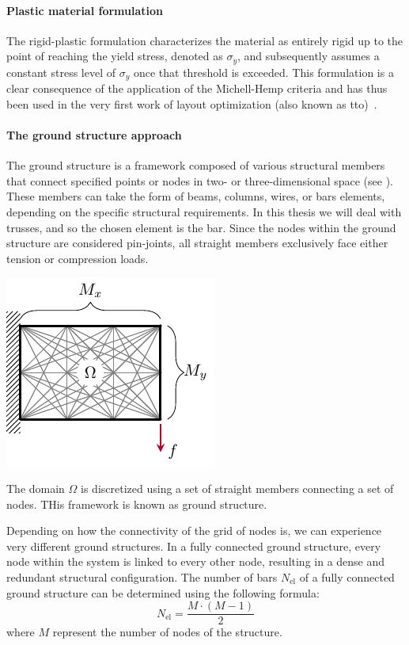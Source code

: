 \paragraph{Plastic material formulation}
The rigid-plastic formulation characterizes the material as entirely rigid up to the point of reaching the yield stress, denoted as $\sigma_y$, and subsequently assumes a constant stress level of $\sigma_y$ once that threshold is exceeded. This formulation is a clear consequence of the application of the Michell-Hemp criteria and has thus been used in the very first work of layout optimization (also known as \gls{tto})~. 

\paragraph{The ground structure approach}
The ground structure is a framework composed of various structural members that connect specified points or nodes in two- or three-dimensional space (see ). These members can take the form of beams, columns, wires, or bars elements, depending on the specific structural requirements. In this thesis we will deal with trusses, and so the chosen element is the bar. Since the nodes within the ground structure are considered pin-joints, all straight members exclusively face either tension or compression loads. 
\begin{marginfigure}
    \centering
    \includegraphics{figures/03_comparison_TO_TTO/03_disc_mesh/d_mesh.pdf}
    \caption{The domain $\Omega$ is discretized using a set of straight members connecting a set of nodes. THis framework is known as ground structure.}
    \label{fig:03_mesh_d}
\end{marginfigure}

Depending on how the connectivity of the grid of nodes is, we can experience very different ground structures. In a fully connected ground structure, every node within the system is linked to every other node, resulting in a dense and redundant structural configuration. The number of bars $N_{\text{el}}$ of a fully connected ground structure can be determined using the following formula:
\begin{equation}
    N_{\text{el}} = \frac{M \cdot (M-1)}{2}
\end{equation}
where $M$ represent the number of nodes of the structure.

